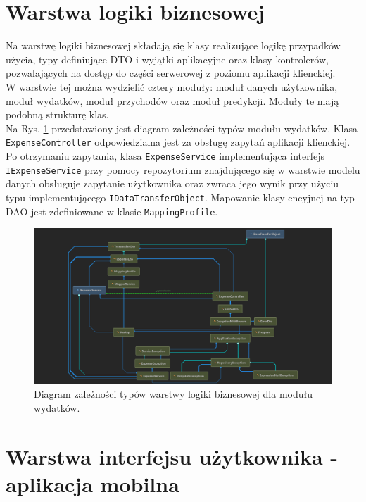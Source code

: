 \section{Warstwa logiki biznesowej}
Na warstwę logiki biznesowej składają się klasy realizujące logikę przypadków użycia, typy definiujące DTO i wyjątki aplikacyjne oraz klasy kontrolerów, pozwalających na dostęp do części serwerowej z poziomu aplikacji klienckiej.\\
W warstwie tej można wydzielić cztery moduły: moduł danych użytkownika, moduł wydatków, moduł przychodów oraz moduł predykcji. Moduły te mają podobną strukturę klas.\\
Na Rys. \ref{expensediagram} przedstawiony jest diagram zależności typów modułu wydatków. Klasa \lstinline|ExpenseController| odpowiedzialna jest za obsługę zapytań aplikacji klienckiej. Po otrzymaniu zapytania, klasa \lstinline|ExpenseService| implementująca interfejs \lstinline|IExpenseService| przy pomocy repozytorium znajdującego się w warstwie modelu danych obsługuje zapytanie użytkownika oraz zwraca jego wynik przy użyciu typu implementującego \lstinline|IDataTransferObject|. Mapowanie klasy encyjnej na typ DAO jest zdefiniowane w klasie \lstinline|MappingProfile|.
\begin{figure}[!ht]
	\begin{center}
		\includegraphics[width=6in]{img/diagram/expense_diagram.png}
		\caption{Diagram zależności typów warstwy logiki biznesowej dla modułu wydatków.}
		\label{expensediagram}
	\end{center}
\end{figure}
\section{Warstwa interfejsu użytkownika - aplikacja mobilna}